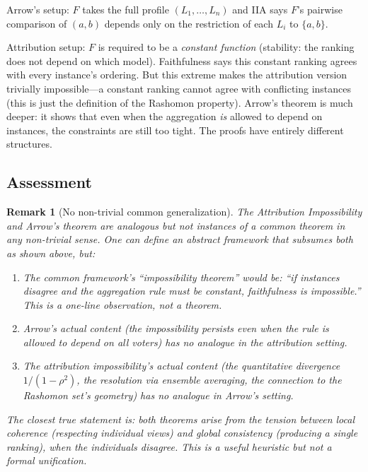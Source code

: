 \documentclass{article}
\newtheorem{remark}[theorem]{Remark}
\begin{document}
Arrow's setup: $F$ takes the full profile $(L_1, \ldots, L_n)$ and IIA says $F$'s pairwise comparison of $(a,b)$ depends only on the restriction of each $L_i$ to $\{a,b\}$.

Attribution setup: $F$ is required to be a \emph{constant function} (stability: the ranking does not depend on which model). Faithfulness says this constant ranking agrees with every instance's ordering. But this extreme makes the attribution version trivially impossible---a constant ranking cannot agree with conflicting instances (this is just the definition of the Rashomon property). Arrow's theorem is much deeper: it shows that even when the aggregation \emph{is} allowed to depend on instances, the constraints are still too tight. The proofs have entirely different structures.

\subsection{Assessment}

\begin{remark}[No non-trivial common generalization]
\label{rem:no-arrow-unification}
The Attribution Impossibility and Arrow's theorem are \emph{analogous}
but not \emph{instances of a common theorem} in any non-trivial sense.
One can define an abstract framework that subsumes both as shown above,
but:
\begin{enumerate}
    \item The common framework's ``impossibility theorem'' would be:
      ``if instances disagree and the aggregation rule must be constant,
      faithfulness is impossible.'' This is a one-line observation,
      not a theorem.
    \item Arrow's actual content (the impossibility persists even when
      the rule \emph{is} allowed to depend on all voters) has no
      analogue in the attribution setting.
    \item The attribution impossibility's actual content (the
      quantitative divergence $1/(1-\rho^2)$, the resolution via
      ensemble averaging, the connection to the Rashomon set's geometry)
      has no analogue in Arrow's setting.
\end{enumerate}
The closest true statement is: \emph{both theorems arise from the
tension between local coherence (respecting individual views) and
global consistency (producing a single ranking), when the individuals
disagree}. This is a useful heuristic but not a formal unification.
\end{remark}
\end{document}
